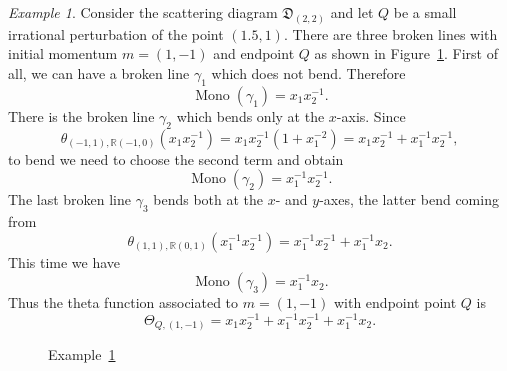 \documentclass[10pt]{amsart}
\theoremstyle{remark}
\newtheorem{example}[theorem]{Example}
\numberwithin{equation}{section}
\newcommand{\RR}{\mathbb{R}}
\newcommand{\fD}{\mathfrak{D}}
\newcommand{\Mono}{\operatorname{Mono}}
\begin{document}
\begin{example} 
  \label{brokenex}
  Consider the scattering diagram $\fD_{(2,2)}$ and let $Q$ be a small
  irrational perturbation of the point $(1.5,1)$. There are three broken lines
  with initial momentum $m = (1,-1)$ and endpoint $Q$ as shown in
  Figure~\ref{figbrokenex}.
  First of all, we can have a broken line $\gamma_1$ which does not bend.
  Therefore
  \[
    \Mono(\gamma_1) = x_1 x_2^{-1}.
  \]
  There is the broken line $\gamma_2$  which bends only at the $x$-axis. Since
  \[ 
    \theta_{(-1,1), \RR(-1,0)} (x_1 x_2^{-1}) = 
    x_1 x_2^{-1}(1+x_1^{-2}) =  x_1 x_2^{-1} + x_1^{-1} x_2^{-1},
  \]
  to bend we need to choose the second term and obtain 
  \[
    \Mono(\gamma_2) =  x_1^{-1} x_2^{-1}.
  \]
  The last broken line $\gamma_3$ bends both at the $x$- and $y$-axes, the
  latter bend coming from
  \[ 
    \theta_{ (1,1), \RR (0,1)} ( x_1^{-1} x_2^{-1}) =  
    x_1^{-1} x_2^{-1} + x_1^{-1} x_2.  
  \]
  This time we have 
  \[
    \Mono (\gamma_3) = x_1^{-1} x_2.
  \]
  Thus the theta function associated to $m = (1,-1)$ with endpoint point $Q$ is 
  \[ 
    \Theta_{Q, (1,-1)} =  
    x_1 x_2^{-1} + x_1^{-1} x_2^{-1} +x_1^{-1} x_2 .  
  \]
\end{example}

\begin{figure}
  \centering
  \caption{Example~\ref{brokenex}} 
  \label{figbrokenex}
\end{figure}
\end{document}
